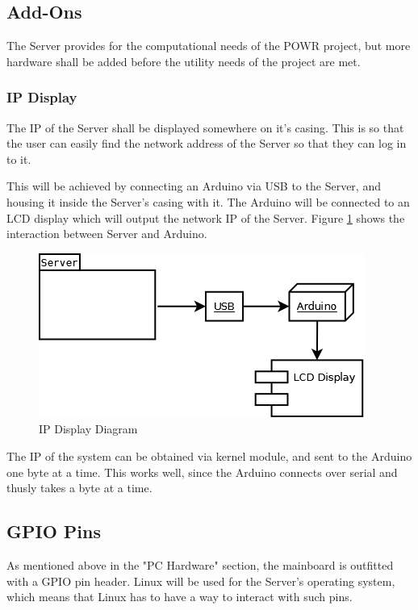 
\subsection{Add-Ons}
The Server provides for the computational needs of the POW\-R project, but
more hardware shall be added before the utility needs of the project are met.

\subsubsection{IP Display}
The IP of the Server shall be displayed somewhere on it's casing. This is so that
the user can easily find the network address of the Server so that they can log in
to it.

This will be achieved by connecting an Arduino via USB to the Server, and housing it 
inside the Server's casing with it. The Arduino will be connected to an LCD display
which will output the network IP of the Server. Figure \ref{ArduinoLCD} shows
the interaction between Server and Arduino.

\begin{figure}
\centering
\includegraphics[scale=0.5]{Hardware/images/ArduinoLCD.png}
\caption{IP Display Diagram}
\label{ArduinoLCD}
\end{figure}

The IP of the system can be obtained via kernel module, and sent to the Arduino
one byte at a time. This works well, since the Arduino connects over serial and
thusly takes a byte at a time.


\subsection{GPIO Pins}
As mentioned above in the "PC Hardware" section, the mainboard is outfitted with a
GPIO pin header. Linux will be used for the Server's operating system, which means
that Linux has to have a way to interact with such pins. 

